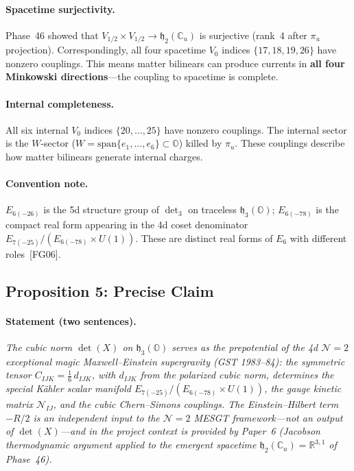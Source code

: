 \paragraph{Spacetime surjectivity.}
Phase~46 showed that $V_{1/2} \times V_{1/2} \to
\mathfrak{h}_2(\mathbb{C}_u)$ is surjective (rank~4 after $\pi_u$
projection). Correspondingly, all four spacetime $V_0$ indices
$\{17, 18, 19, 26\}$ have nonzero couplings.
This means matter bilinears can produce currents in \textbf{all four
Minkowski directions}---the coupling to spacetime is complete.

\paragraph{Internal completeness.}
All six internal $V_0$ indices $\{20, \ldots, 25\}$ have nonzero
couplings. The internal sector is the $W$-sector
($W = \mathrm{span}\{e_1, \ldots, e_6\} \subset \mathbb{O}$)
killed by $\pi_u$. These couplings describe how matter bilinears
generate internal charges.

\paragraph{Convention note.}
$E_{6(-26)}$ is the 5d structure group of $\det_3$ on traceless
$\mathfrak{h}_3(\mathbb{O})$;
$E_{6(-78)}$ is the compact real form appearing in the 4d coset
denominator $E_{7(-25)}/(E_{6(-78)} \times U(1))$.
These are distinct real forms of $E_6$ with different roles~[FG06].


\subsection*{Proposition 5: Precise Claim}

\paragraph{Statement (two sentences).}
\emph{The cubic norm $\det(X)$ on $\mathfrak{h}_3(\mathbb{O})$ serves
as the prepotential of the 4d $\mathcal{N}=2$ exceptional magic
Maxwell--Einstein supergravity (GST 1983--84): the symmetric tensor
$C_{IJK} = \frac{1}{6}\, d_{IJK}$, with $d_{IJK}$ from the
polarized cubic norm, determines the special K\"ahler scalar manifold
$E_{7(-25)}/(E_{6(-78)} \times U(1))$, the gauge kinetic matrix
$\mathcal{N}_{IJ}$, and the cubic Chern--Simons couplings.
The Einstein--Hilbert term $-R/2$ is an independent input to the
$\mathcal{N}=2$ MESGT framework---not an output of $\det(X)$---and in
the project context is provided by Paper~6 (Jacobson thermodynamic
argument applied to the emergent spacetime
$\mathfrak{h}_2(\mathbb{C}_u) = \mathbb{R}^{3,1}$ of Phase~46).}

